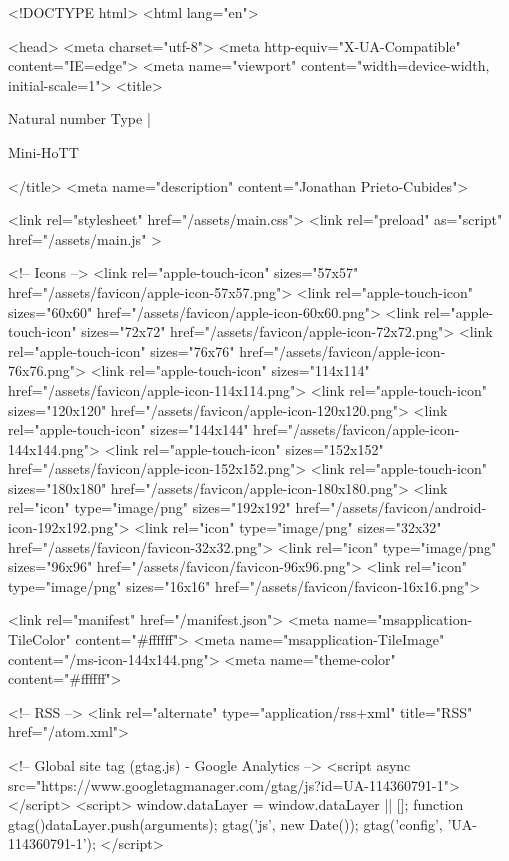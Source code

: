 <!DOCTYPE html>
<html lang="en">

<head>
  <meta charset="utf-8">
  <meta http-equiv="X-UA-Compatible" content="IE=edge">
  <meta name="viewport" content="width=device-width, initial-scale=1">
  <title>
    
      
        Natural number Type |
      
        Mini-HoTT
    
  </title>
  <meta name="description" content="Jonathan Prieto-Cubides">

  <link rel="stylesheet" href="/assets/main.css">
  <link rel="preload" as="script" href="/assets/main.js" >

  <!-- Icons -->
  <link rel="apple-touch-icon" sizes="57x57" href="/assets/favicon/apple-icon-57x57.png">
  <link rel="apple-touch-icon" sizes="60x60" href="/assets/favicon/apple-icon-60x60.png">
  <link rel="apple-touch-icon" sizes="72x72" href="/assets/favicon/apple-icon-72x72.png">
  <link rel="apple-touch-icon" sizes="76x76" href="/assets/favicon/apple-icon-76x76.png">
  <link rel="apple-touch-icon" sizes="114x114" href="/assets/favicon/apple-icon-114x114.png">
  <link rel="apple-touch-icon" sizes="120x120" href="/assets/favicon/apple-icon-120x120.png">
  <link rel="apple-touch-icon" sizes="144x144" href="/assets/favicon/apple-icon-144x144.png">
  <link rel="apple-touch-icon" sizes="152x152" href="/assets/favicon/apple-icon-152x152.png">
  <link rel="apple-touch-icon" sizes="180x180" href="/assets/favicon/apple-icon-180x180.png">
  <link rel="icon" type="image/png" sizes="192x192"  href="/assets/favicon/android-icon-192x192.png">
  <link rel="icon" type="image/png" sizes="32x32" href="/assets/favicon/favicon-32x32.png">
  <link rel="icon" type="image/png" sizes="96x96" href="/assets/favicon/favicon-96x96.png">
  <link rel="icon" type="image/png" sizes="16x16" href="/assets/favicon/favicon-16x16.png">

  <link rel="manifest" href="/manifest.json">
  <meta name="msapplication-TileColor" content="#ffffff">
  <meta name="msapplication-TileImage" content="/ms-icon-144x144.png">
  <meta name="theme-color" content="#ffffff">

  <!-- RSS -->
  <link rel="alternate" type="application/rss+xml" title="RSS" href="/atom.xml">

  <!-- Global site tag (gtag.js) - Google Analytics -->
  <script async src="https://www.googletagmanager.com/gtag/js?id=UA-114360791-1"></script>
  <script>
    window.dataLayer = window.dataLayer || [];
    function gtag(){dataLayer.push(arguments);}
    gtag('js', new Date());
    gtag('config', 'UA-114360791-1');
  </script>

